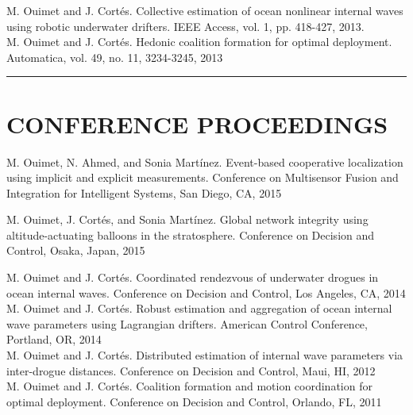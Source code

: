 \documentclass{res}
\begin{document}
\begin{resume}
M. Ouimet and J. Cort\'es. Collective estimation of ocean nonlinear internal waves using robotic underwater drifters. IEEE Access, vol. 1, pp. 418-427, 2013. \\

\vspace*{-4ex}
M. Ouimet and J. Cort\'es. Hedonic coalition formation for optimal deployment.
Automatica, vol. 49, no. 11, 3234-3245, 2013 \\
\vspace{-6ex}

\hspace{-8.5ex}\rule{16.5cm}{0.4pt}
 \vspace*{-3ex}
\section{CONFERENCE PROCEEDINGS}
\vspace{0ex}
M. Ouimet, N. Ahmed, and Sonia Mart\'inez. Event-based cooperative localization using implicit and explicit measurements. Conference on Multisensor Fusion and Integration for Intelligent Systems, San Diego, CA, 2015

M. Ouimet, J. Cort\'es, and Sonia Mart\'inez. Global network integrity using altitude-actuating balloons in the stratosphere.  Conference on Decision and Control, Osaka, Japan, 2015 \\

\vspace*{-4ex}

M. Ouimet and J. Cort\'es. Coordinated rendezvous of underwater drogues in ocean internal waves. Conference on Decision and Control, Los Angeles, CA, 2014\\

\vspace*{-4ex}
M. Ouimet and J. Cort\'es. Robust estimation and aggregation of ocean internal wave parameters using Lagrangian drifters. American Control Conference, Portland, OR, 2014\\

\vspace*{-4ex}
 M. Ouimet and J. Cort\'es.  Distributed estimation of internal wave parameters via inter-drogue distances.
Conference on Decision and Control, Maui, HI, 2012 \\

\vspace*{-4ex} M. Ouimet and J. Cort\'es. Coalition formation and
motion coordination for optimal deployment.  Conference on Decision and Control,
Orlando, FL, 2011
\vspace*{-2ex}


\end{resume}
\end{document}
